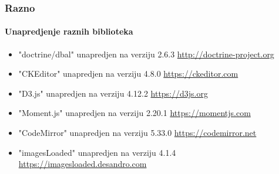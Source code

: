 \begin{frame}[fragile]
	\frametitle{Razno}
	\framesubtitle{Unapredjenje raznih biblioteka}

	\begin{itemize}
		\item "doctrine/dbal" unapredjen na verziju 2.6.3\newline
			\smaller
				\href{http://doctrine-project.org}{http://doctrine-project.org}
			\normalsize

		\item "CKEditor" unapredjen na verziju 4.8.0\newline
			\smaller
				\href{https://ckeditor.com}{https://ckeditor.com}
			\normalsize

		\item "D3.js" unapredjen na verziju 4.12.2\newline
			\smaller
				\href{https://d3js.org}{https://d3js.org}
			\normalsize

		\item "Moment.js" unapredjen na verziju 2.20.1\newline
			\smaller
				\href{https://momentjs.com}{https://momentjs.com}
			\normalsize

		\item "CodeMirror" unapredjen na verziju 5.33.0\newline
			\smaller
				\href{https://codemirror.net}{https://codemirror.net}
			\normalsize

		\item "imagesLoaded" unapredjen na verziju 4.1.4\newline
			\smaller
				\href{https://imagesloaded.desandro.com}{https://imagesloaded.desandro.com}
			\normalsize

	\end{itemize}

\end{frame}

